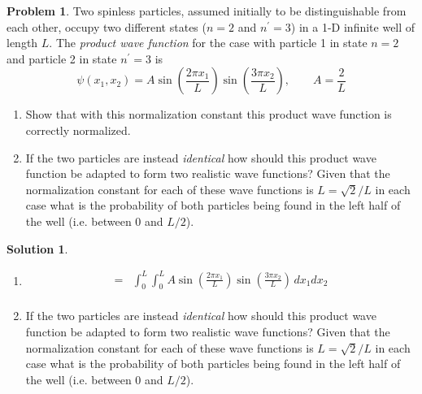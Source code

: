 \documentclass[10pt]{article}
\theoremstyle{definition}
\newtheorem{problem}{Problem}
\newtheorem{soln}{Solution}
\begin{document}
\begin{problem}
Two spinless particles, assumed initially to be distinguishable from each other, occupy two different
states ($n=2$ and $n^\prime=3$) in a 1-D infinite well of length $L$. The \emph{product wave function} for the case with particle 1 in
state $n=2$ and particle 2 in state $n^\prime=3$ is
$$\psi(x_1,x_2)=A\sin\left(\frac{2\pi x_1}{L}\right)\sin\left(\frac{3\pi x_2}{L}\right),\qquad A=\frac{2}{L}$$
\begin{enumerate}[label=(\alph*)]
  \item Show that with this normalization constant this product wave function is correctly normalized.
  \item If the two particles are instead \emph{identical} how should this product wave function be adapted to form two
        realistic wave functions? Given that the normalization constant for each of these wave functions is $L=\sqrt{2}/L$
        in each case what is the probability of both particles being found in the left half of the well (i.e. between $0$ and $L/2$).
\end{enumerate}
\end{problem}
\begin{soln}
  \begin{enumerate}[label=(\alph*)]
    \item \begin{align*}
      =&\int_{0}^{L}\int_{0}^{L}A\sin\left(\frac{2\pi x_1}{L}\right)\sin\left(\frac{3\pi x_2}{L}\right)\,dx_1dx_2\\
    \end{align*}
    \item If the two particles are instead \emph{identical} how should this product wave function be adapted to form two
          realistic wave functions? Given that the normalization constant for each of these wave functions is $L=\sqrt{2}/L$
          in each case what is the probability of both particles being found in the left half of the well (i.e. between $0$ and $L/2$).
  \end{enumerate}
\end{soln}
\end{document}

